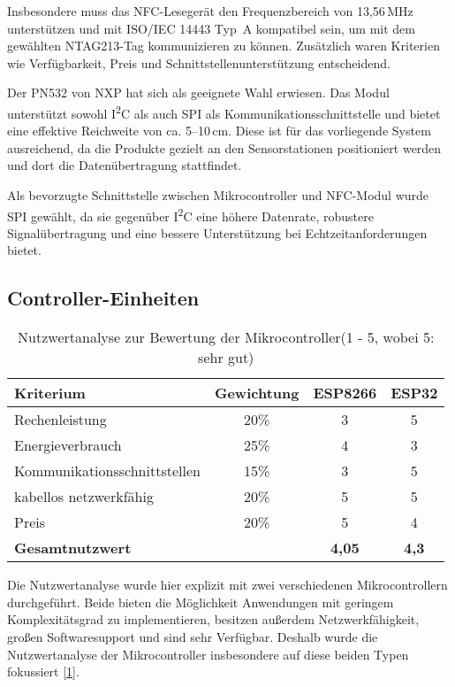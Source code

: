 Insbesondere muss das NFC-Lesegerät den Frequenzbereich von 13{,}56\,MHz unterstützen und mit ISO/IEC 14443 Typ~A kompatibel sein, um mit dem gewählten NTAG213-Tag kommunizieren zu können. Zusätzlich waren Kriterien wie Verfügbarkeit, Preis und Schnittstellenunterstützung entscheidend.

Der PN532 von NXP hat sich als geeignete Wahl erwiesen. Das Modul unterstützt sowohl I\textsuperscript{2}C als auch SPI als Kommunikationsschnittstelle und bietet eine effektive Reichweite von ca. 5–10\,cm. Diese ist für das vorliegende System ausreichend, da die Produkte gezielt an den Sensorstationen positioniert werden und dort die Datenübertragung stattfindet.

Als bevorzugte Schnittstelle zwischen Mikrocontroller und NFC-Modul wurde SPI gewählt, da sie gegenüber I\textsuperscript{2}C eine höhere Datenrate, robustere Signalübertragung und eine bessere Unterstützung bei Echtzeitanforderungen bietet.


\subsection{Controller-Einheiten}

\begin{table}[H]
	\centering
	\caption{Nutzwertanalyse zur Bewertung der Mikrocontroller(1 - 5, wobei 5: sehr gut)}
	\label{tab:nwa_ctrl}
	\begin{tabular}{|l|c|c|c|}
		\hline
		\textbf{Kriterium} & \textbf{Gewichtung} & \textbf{ESP8266} & \textbf{ESP32} \\ \hline
		Rechenleistung          & 20\% & 3 & 5 \\ \hline
		Energieverbrauch        & 25\% & 4 & 3 \\ \hline
		Kommunikationsschnittstellen & 15\% & 3 & 5 \\ \hline
		kabellos netzwerkfähig	& 20\% & 5 & 5 \\ \hline
		Preis                   & 20\% & 5 & 4 \\ \hline
		\textbf{Gesamtnutzwert} &       & \textbf{4,05} & \textbf{4,3} \\ \hline
	\end{tabular}
\end{table}

Die Nutzwertanalyse wurde hier explizit mit zwei verschiedenen Mikrocontrollern durchgeführt. Beide bieten die Möglichkeit Anwendungen mit geringem Komplexitätsgrad zu implementieren, besitzen außerdem Netzwerkfähigkeit, großen Softwaresupport und sind sehr Verfügbar. Deshalb wurde die Nutzwertanalyse der Mikrocontroller insbesondere auf diese beiden Typen fokussiert [\ref{tab:nwa_ctrl}]. 

